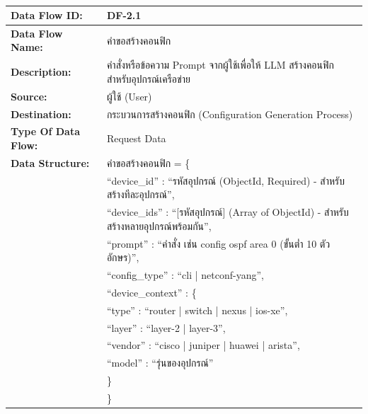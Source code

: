 
\begin{table}[H]
    \caption{}
    \label{tab:df-2-1}
    \fontSixTeen 
    \begin{tabularx}{\textwidth}{|l|L|} 
        \hline
        \textbf{Data Flow ID:} & DF-2.1 \\
        \hline
        \textbf{Data Flow Name:} & คำขอสร้างคอนฟิก \\
        \hline
        \textbf{Description:} & คำสั่งหรือข้อความ Prompt จากผู้ใช้เพื่อให้ LLM สร้างคอนฟิกสำหรับอุปกรณ์เครือข่าย \\
        \hline
        \textbf{Source:} & ผู้ใช้ (User) \\
        \hline
        \textbf{Destination:} & กระบวนการสร้างคอนฟิก (Configuration Generation Process) \\
        \hline
        \textbf{Type Of Data Flow:} & Request Data \\
        \hline
        \textbf{Data Structure:} & คำขอสร้างคอนฟิก = \{ \nonumber \\
                        & \hspace{1em} ``device\_id'' : ``รหัสอุปกรณ์ (ObjectId, Required) - สำหรับสร้างทีละอุปกรณ์'', \nonumber \\
                        & \hspace{1em} ``device\_ids'' : ``[รหัสอุปกรณ์] (Array of ObjectId) - สำหรับสร้างหลายอุปกรณ์พร้อมกัน'', \nonumber \\
                        & \hspace{1em} ``prompt'' : ``คำสั่ง เช่น config ospf area 0 (ขั้นต่ำ 10 ตัวอักษร)'', \nonumber \\
                        & \hspace{1em} ``config\_type'' : ``cli | netconf-yang'', \nonumber \\
                        & \hspace{1em} ``device\_context'' : \{ \nonumber \\
                        & \hspace{2em} ``type'' : ``router | switch | nexus | ios-xe'', \nonumber \\
                        & \hspace{2em} ``layer'' : ``layer-2 | layer-3'', \nonumber \\
                        & \hspace{2em} ``vendor'' : ``cisco | juniper | huawei | arista'', \nonumber \\
                        & \hspace{2em} ``model'' : ``รุ่นของอุปกรณ์'' \nonumber \\
                        & \hspace{1em} \} \nonumber \\
                        & \} \\
        \hline
    \end{tabularx}
\end{table}

